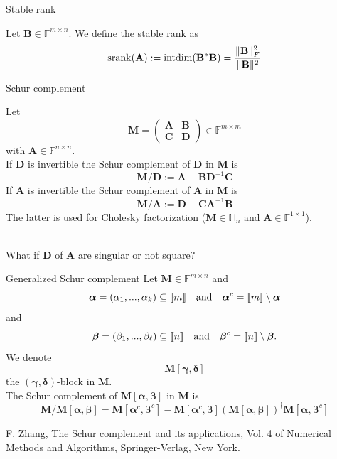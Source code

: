 \documentclass{beamer}
\newcommand{\bgk}[1]{\boldsymbol{#1}}
\newcommand{\balpha}{\bgk{\alpha}}
\newcommand{\bbeta}{\bgk{\beta}}
\newcommand{\bgamma}{\bgk{\gamma}}
\newcommand{\bdelta}{\bgk{\delta}}
\newcommand{\bvec}[1]{\mathbf{#1}}
\newcommand{\vA}{\bvec{A}}
\newcommand{\vB}{\bvec{B}}
\newcommand{\vC}{\bvec{C}}
\newcommand{\vD}{\bvec{D}}
\newcommand{\vM}{\bvec{M}}
\begin{document}
\begin{frame}{Stable rank}

Let $\vB \in \mathbb{F}^{m \times n}$. We define the stable rank as
$$
{\rm srank}(\vA)
:=
{\rm intdim}(\vB^*\vB)
=
\frac{\Vert \vB \Vert_F^2}{\Vert \vB \Vert^2}
$$
    
\end{frame}

\begin{frame}{Schur complement}

Let 
$$
\vM = 
\begin{pmatrix}
\vA & \vB \\
\vC & \vD
\end{pmatrix} \in \mathbb{F}^{m \times m}
$$
with $\vA \in \mathbb{F}^{n \times n}$.\\
If $\vD$ is invertible the Schur complement of $\vD$ in $\vM$ is
$$
\vM/\vD
:=
\vA - \vB \vD^{-1} \vC
$$
If $\vA$ is invertible the Schur complement of $\vA$ in $\vM$ is
$$
\vM/\vA
:=
\vD - \vC \vA^{-1} \vB
$$
The latter is used for Cholesky factorization ($\vM \in \mathbb{H}_n$ and $\vA \in \mathbb{F}^{1 \times 1}$).\\
~\\
\begin{center}
What if $\vD$ of $\vA$ are singular or not square?
\end{center}

\end{frame}


\begin{frame}{Generalized Schur complement}
Let $\vM\in\mathbb{F}^{m \times n}$ and 
$$
\balpha = (\alpha_1, ...,\alpha_k) \subseteq [\![ m ]\!]
\quad {\rm and} \quad  
\balpha^c = [\![ m ]\!] \setminus  \balpha
$$
and
$$
\bbeta = (\beta_1, ...,\beta_\ell) \subseteq [\![ n ]\!]
\quad {\rm and} \quad  
\bbeta^c = [\![ n ]\!] \setminus  \bbeta.
$$
We denote $$
\vM[\bgamma, \bdelta] 
$$
the $(\bgamma, \bdelta)$-block in $\vM$.\\
The Schur complement of $\vM[\balpha, \bbeta]$ in $\vM$ is
$$
\vM / \vM[\balpha, \bbeta]
=
\vM[\balpha^c, \bbeta^c]
-
\vM[\balpha^c, \bbeta] \left(\vM[\balpha, \bbeta] \right)^\dagger \vM[\balpha, \bbeta^c]
$$

\vfill
\begin{footnotesize}
F. Zhang, The Schur complement and its applications, Vol. 4 of Numerical Methods and Algorithms,
Springer-Verlag, New York.
\end{footnotesize}
\end{frame}
\end{document}
